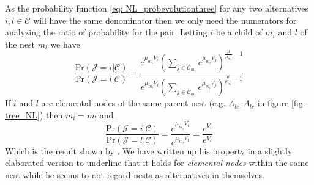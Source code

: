 As the probability function \eqref{eq: NL_probevolutionthree} for any two alternatives $i,l\in\mathcal{C}$ will have the same denominator then we only need the numerators for analyzing the ratio of probability for the pair. Letting $i$ be a child of $m_i$ and $l$ of the nest $m_l$ we have
\begin{equation} \label{eq: NL_ratio}
  \frac{\textrm{Pr}(\mathcal{J}=i|\mathcal{C})}
    {\textrm{Pr}(\mathcal{J}=l|\mathcal{C})}
  =\frac{e^{\mu_{m_i} V_i}
    \left(\sum\limits_{j\in\mathcal{C}_{m_i} }e^{\mu_{m_i} V_j}\right)
    ^{\frac{\mu}{\mu_{m_i} }-1}  }
  {e^{\mu_{m_l} V_l}
    \left(\sum\limits_{j\in\mathcal{C}_{m_l} }e^{\mu_{m_l} V_j}  \right)
    ^{\frac{\mu}{\mu_{m_l} }-1}  }
\end{equation}
If $i$ and $l$ are elemental nodes of the same parent nest (e.g. $A_{lc},A_{lr}$ in figure \ref{fig: tree_NL}) then $m_i=m_l$ and
\begin{equation} \label{eq: NL_ratio_IIA}
  \frac{\textrm{Pr}(\mathcal{J}=i|\mathcal{C})}
    {\textrm{Pr}(\mathcal{J}=l|\mathcal{C})}
  =\frac{e^{\mu_{m_{i}} V_i}  }
    {e^{\mu_{m_{l}} V_l}  }
  =\frac{e^{V_i}  }
      {e^{V_l}  }
\end{equation}
Which is the result shown by \citet{train_discrete_2009}. We have written up his  property in a slightly elaborated version to underline that it holds for \textit{elemental nodes} within the same nest while he seems to not regard nests as alternatives in themselves.

